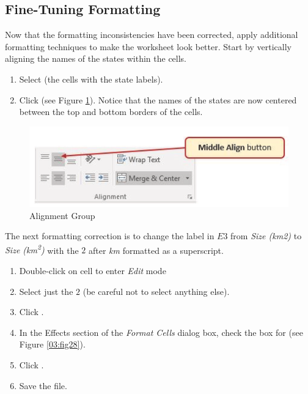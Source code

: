 \subsection{Fine-Tuning Formatting}

Now that the formatting inconsistencies have been corrected, apply additional formatting techniques to make the worksheet look better. Start by vertically aligning the names of the states within the cells.

\begin{enumerate}
	\item Select  (the cells with the state labels).
	\item Click  (see Figure \ref{03:fig27}). Notice that the names of the states are now centered between the top and bottom borders of the cells.
\end{enumerate}

\begin{figure}[H]
	\centering
	\includegraphics[width=\maxwidth{.95\linewidth}]{gfx/ch03_fig27}
	\caption{Alignment Group}
	\label{03:fig27}
\end{figure}

The next formatting correction is to change the label in $ E3 $ from \textit{Size (km2)} to \textit{Size (km\textsuperscript{2})} with the $ 2 $ after \textit{km} formatted as a superscript.

\begin{enumerate}
	\item Double-click on cell  to enter \textit{Edit} mode
	\item Select just the $ 2 $ (be careful not to select anything else).
	\item Click . 	
	\item In the Effects section of the \textit{Format Cells} dialog box, check the box for  (see Figure \ref{03:fig28}). 
	\item Click .
	\item Save the  file.
\end{enumerate}

